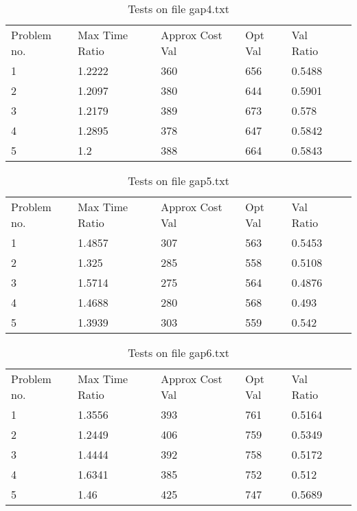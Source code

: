     \begin{table}[]
    \caption{Tests on file gap4.txt}
    \centering
    \begin{tabular}{llllll}
    Problem no. & Max Time Ratio & Approx Cost Val  & Opt Val & Val Ratio \\ 1 & 1.2222 & 360 & 656 & 0.5488\\ \hline
2 & 1.2097 & 380 & 644 & 0.5901\\ \hline
3 & 1.2179 & 389 & 673 & 0.578\\ \hline
4 & 1.2895 & 378 & 647 & 0.5842\\ \hline
5 & 1.2 & 388 & 664 & 0.5843\\ \hline
\end{tabular}
    \end{table}
    

    \begin{table}[]
    \caption{Tests on file gap5.txt}
    \centering
    \begin{tabular}{llllll}
    Problem no. & Max Time Ratio & Approx Cost Val  & Opt Val & Val Ratio \\ 1 & 1.4857 & 307 & 563 & 0.5453\\ \hline
2 & 1.325 & 285 & 558 & 0.5108\\ \hline
3 & 1.5714 & 275 & 564 & 0.4876\\ \hline
4 & 1.4688 & 280 & 568 & 0.493\\ \hline
5 & 1.3939 & 303 & 559 & 0.542\\ \hline
\end{tabular}
    \end{table}
    

    \begin{table}[]
    \caption{Tests on file gap6.txt}
    \centering
    \begin{tabular}{llllll}
    Problem no. & Max Time Ratio & Approx Cost Val  & Opt Val & Val Ratio \\ 1 & 1.3556 & 393 & 761 & 0.5164\\ \hline
2 & 1.2449 & 406 & 759 & 0.5349\\ \hline
3 & 1.4444 & 392 & 758 & 0.5172\\ \hline
4 & 1.6341 & 385 & 752 & 0.512\\ \hline
5 & 1.46 & 425 & 747 & 0.5689\\ \hline
\end{tabular}
    \end{table}
    

